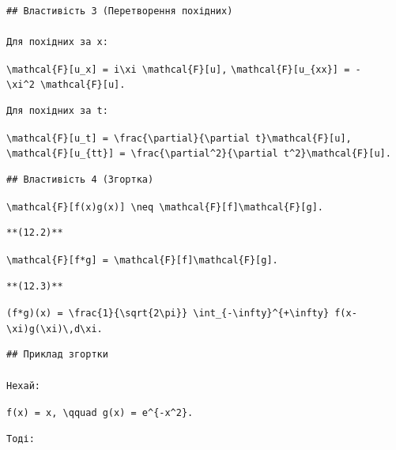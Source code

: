 \documentclass[
  ukrainian,
]{article}
\begin{document}
\begin{verbatim}
## Властивість 3 (Перетворення похідних)

Для похідних за x:
\end{verbatim}

\texttt{\textbackslash{}mathcal\{F\}{[}u\_x{]}\ =\ i\textbackslash{}xi\ \textbackslash{}mathcal\{F\}{[}u{]},}
\texttt{\textbackslash{}mathcal\{F\}{[}u\_\{xx\}{]}\ =\ -\textbackslash{}xi\^{}2\ \textbackslash{}mathcal\{F\}{[}u{]}.}

\begin{verbatim}
Для похідних за t:
\end{verbatim}

\texttt{\textbackslash{}mathcal\{F\}{[}u\_t{]}\ =\ \textbackslash{}frac\{\textbackslash{}partial\}\{\textbackslash{}partial\ t\}\textbackslash{}mathcal\{F\}{[}u{]},}
\texttt{\textbackslash{}mathcal\{F\}{[}u\_\{tt\}{]}\ =\ \textbackslash{}frac\{\textbackslash{}partial\^{}2\}\{\textbackslash{}partial\ t\^{}2\}\textbackslash{}mathcal\{F\}{[}u{]}.}

\begin{verbatim}
## Властивість 4 (Згортка)
\end{verbatim}

\texttt{\textbackslash{}mathcal\{F\}{[}f(x)g(x){]}\ \textbackslash{}neq\ \textbackslash{}mathcal\{F\}{[}f{]}\textbackslash{}mathcal\{F\}{[}g{]}.}

\begin{verbatim}
**(12.2)**
\end{verbatim}

\texttt{\textbackslash{}mathcal\{F\}{[}f*g{]}\ =\ \textbackslash{}mathcal\{F\}{[}f{]}\textbackslash{}mathcal\{F\}{[}g{]}.}

\begin{verbatim}
**(12.3)**
\end{verbatim}

\texttt{(f*g)(x)\ =\ \textbackslash{}frac\{1\}\{\textbackslash{}sqrt\{2\textbackslash{}pi\}\}\ \textbackslash{}int\_\{-\textbackslash{}infty\}\^{}\{+\textbackslash{}infty\}\ f(x-\textbackslash{}xi)g(\textbackslash{}xi)\textbackslash{},d\textbackslash{}xi.}

\begin{verbatim}
## Приклад згортки

Нехай:
\end{verbatim}

\texttt{f(x)\ =\ x,\ \textbackslash{}qquad\ g(x)\ =\ e\^{}\{-x\^{}2\}.}

\begin{verbatim}
Тоді:
\end{verbatim}
\end{document}
